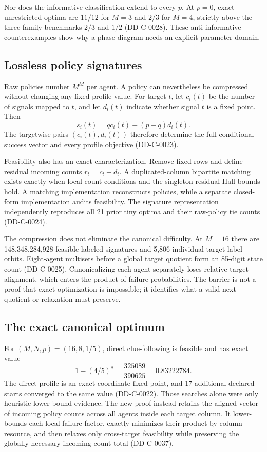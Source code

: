 \documentclass[11pt]{article}
\theoremstyle{remark}
\begin{document}
Nor does the informative classification extend to every $p$. At $p=0$, exact
unrestricted optima are $11/12$ for $M=3$ and $2/3$ for $M=4$, strictly above the
three-family benchmarks $2/3$ and $1/2$ (DD-C-0028). These anti-informative
counterexamples show why a phase diagram needs an explicit parameter domain.

\subsection{Lossless policy signatures}

Raw policies number $M^M$ per agent. A policy can nevertheless be compressed
without changing any fixed-profile value. For target $t$, let $c_i(t)$ be the
number of signals mapped to $t$, and let $d_i(t)$ indicate whether signal $t$ is a
fixed point. Then
\[
s_i(t)=q c_i(t)+(p-q)d_i(t).
\]
The targetwise pairs $(c_i(t),d_i(t))$ therefore determine the full conditional
success vector and every profile objective (DD-C-0023).

Feasibility also has an exact characterization. Remove fixed rows and define
residual incoming counts $r_t=c_t-d_t$. A duplicated-column bipartite matching
exists exactly when local count conditions and the singleton residual Hall bounds
hold. A matching implementation reconstructs policies, while a separate closed-
form implementation audits feasibility. The signature representation independently
reproduces all 21 prior tiny optima and their raw-policy tie counts (DD-C-0024).

The compression does not eliminate the canonical difficulty. At $M=16$ there
are 148,348,284,928 feasible labeled signatures and 5,806 individual target-label
orbits. Eight-agent multisets before a global target quotient form an 85-digit
state count (DD-C-0025). Canonicalizing each agent separately loses relative target
alignment, which enters the product of failure probabilities. The barrier is not
a proof that exact optimization is impossible; it identifies what a valid next
quotient or relaxation must preserve.

\subsection{The exact canonical optimum}

For $(M,N,p)=(16,8,1/5)$, direct clue-following is feasible and has exact value
\[
1-(4/5)^8=\frac{325089}{390625}=0.83222784.
\]
The direct profile is an exact coordinate fixed point, and 17 additional declared
starts converged to the same value (DD-C-0022). Those searches alone were only
heuristic lower-bound evidence. The new proof instead retains the aligned vector
of incoming policy counts across all agents inside each target column. It lower-
bounds each local failure factor, exactly minimizes their product by column
resource, and then relaxes only cross-target feasibility while preserving the
globally necessary incoming-count total (DD-C-0037).
\end{document}
